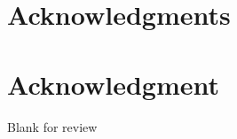 \documentclass[10pt, conference,compsoc]{IEEEtran}
\begin{document}






\ifCLASSOPTIONcompsoc
  \section*{Acknowledgments}
\else
  \section*{Acknowledgment}
\fi


Blank for review









%





\end{document}
